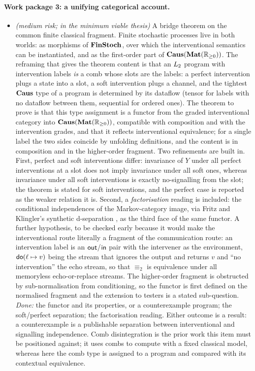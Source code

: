 \paragraph{Work package 3: a unifying categorical account.}
\begin{itemize}[nosep]
\item[3a] \textit{(medium risk; in the minimum viable thesis)} A bridge theorem on the common finite classical fragment. Finite stochastic processes live in both worlds: as morphisms of $\mathbf{FinStoch}$, over which the interventional semantics can be instantiated, and as the first-order part of $\mathbf{Caus}(\mathbf{Mat}(\mathbb{R}_{\geq 0}))$. The reframing that gives the theorem content is that an $L_{2}$ program with intervention labels \emph{is} a comb whose slots are the labels: a perfect intervention plugs a state into a slot, a soft intervention plugs a channel, and the tightest $\mathbf{Caus}$ type of a program is determined by its dataflow (tensor for labels with no dataflow between them, sequential for ordered ones). The theorem to prove is that this type assignment is a functor from the graded interventional category into $\mathbf{Caus}(\mathbf{Mat}(\mathbb{R}_{\geq 0}))$, compatible with composition and with the intervention grades, and that it reflects interventional equivalence; for a single label the two sides coincide by unfolding definitions, and the content is in composition and in the higher-order fragment. Two refinements are built in. First, perfect and soft interventions differ: invariance of $Y$ under all perfect interventions at a slot does not imply invariance under all soft ones, whereas invariance under all soft interventions is exactly no-signalling from the slot; the theorem is stated for soft interventions, and the perfect case is reported as the weaker relation it is. Second, a \emph{factorisation} reading is included: the conditional independences of the Markov-category image, via Fritz and Klingler's synthetic d-separation \cite{fritz2023dseparation}, as the third face of the same functor. A further hypothesis, to be checked early because it would make the interventional route literally a fragment of the communication route: an intervention label is an $\mathsf{out}$/$\mathsf{in}$ pair with the intervener as the environment, $\mathsf{do}(\ell\mapsto v)$ being the stream that ignores the output and returns $v$ and ``no intervention'' the echo stream, so that $\equiv_2$ is equivalence under all memoryless echo-or-replace streams. The higher-order fragment is obstructed by sub-normalisation from conditioning, so the functor is first defined on the normalised fragment and the extension to testers is a stated sub-question. \emph{Done:} the functor and its properties, or a counterexample program; the soft/perfect separation; the factorisation reading. Either outcome is a result: a counterexample is a publishable separation between interventional and signalling independence. Comb disintegration \cite{jacobs2019causal} is the prior work this item must be positioned against; it uses combs to compute with a fixed classical model, whereas here the comb type is assigned to a program and compared with its contextual equivalence.

\end{itemize}
